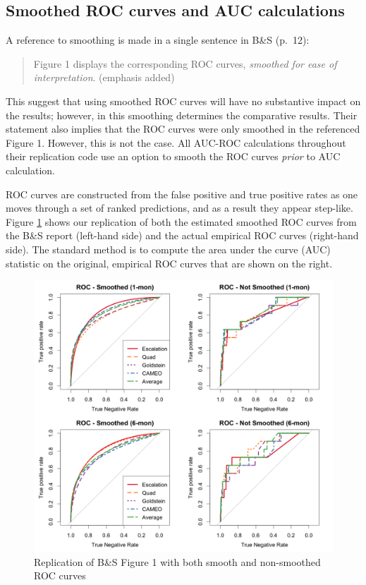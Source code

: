 \documentclass[
]{article}
\begin{document}
\hypertarget{smoothed-roc-curves-and-auc-calculations}{%
\subsection{Smoothed ROC curves and AUC calculations}\label{smoothed-roc-curves-and-auc-calculations}}

A reference to smoothing is made in a single sentence in B\&S (p.~12):

\begin{quote}
Figure 1 displays the corresponding ROC curves, \emph{smoothed for ease of interpretation}. (emphasis added)
\end{quote}

This suggest that using smoothed ROC curves will have no substantive impact on the results; however, in this smoothing determines the comparative results. Their statement also implies that the ROC curves were only smoothed in the referenced Figure 1. However, this is not the case. All AUC-ROC calculations throughout their replication code use an option to smooth the ROC curves \emph{prior} to AUC calculation.

ROC curves are constructed from the false positive and true positive rates as one moves through a set of ranked predictions, and as a result they appear step-like. Figure \ref{fig:rocs} shows our replication of both the estimated smoothed ROC curves from the B\&S report (left-hand side) and the actual empirical ROC curves (right-hand side). The standard method is to compute the area under the curve (AUC) statistic on the original, empirical ROC curves that are shown on the right.

\begin{figure}
\caption{Replication of B\&S Figure 1 with both smooth and non-smoothed ROC curves\label{fig:rocs}}
\centering
\includegraphics[width=.95\linewidth]{figures/figure1-replicated.png}
\end{figure}
\end{document}
